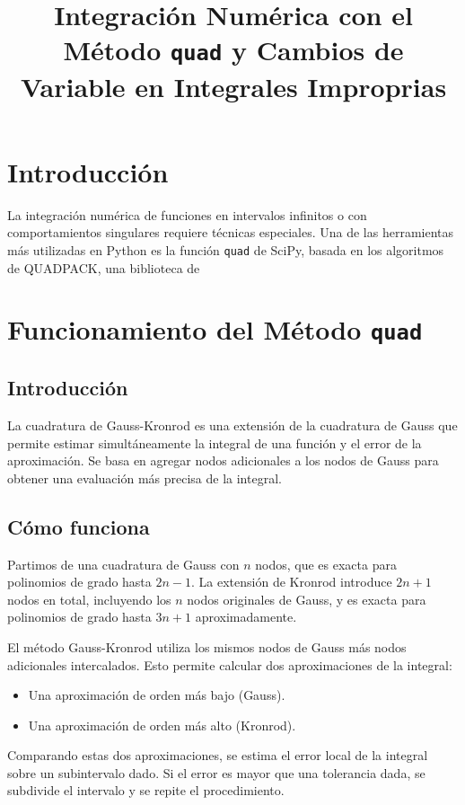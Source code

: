 \documentclass{article}
\title{Integraci\'on Num\'erica con el M\'etodo \texttt{quad} y Cambios de Variable en Integrales Improprias}
\author{}
\date{}
\begin{document}
\maketitle

\section{Introducción}
La integración numérica de funciones en intervalos infinitos o con comportamientos singulares requiere t\'ecnicas especiales. Una de las herramientas más utilizadas en Python es la función \texttt{quad} de SciPy, basada en los algoritmos de QUADPACK, una biblioteca de 

\section{Funcionamiento del Método \texttt{quad}}
\subsection{Introducción}
La cuadratura de Gauss-Kronrod es una extensión de la cuadratura de Gauss que permite estimar simultáneamente la integral de una función y el error de la aproximación. Se basa en agregar nodos adicionales a los nodos de Gauss para obtener una evaluación más precisa de la integral.

\subsection{Cómo funciona}
Partimos de una cuadratura de Gauss con $n$ nodos, que es exacta para polinomios de grado hasta $2n-1$. La extensi\'on de Kronrod introduce $2n+1$ nodos en total, incluyendo los $n$ nodos originales de Gauss, y es exacta para polinomios de grado hasta $3n+1$ aproximadamente.

El método Gauss-Kronrod utiliza los mismos nodos de Gauss más nodos adicionales intercalados. Esto permite calcular dos aproximaciones de la integral:
\begin{itemize}
    \item Una aproximación de orden más bajo (Gauss).
    \item Una aproximación de orden más alto (Kronrod).
\end{itemize}

Comparando estas dos aproximaciones, se estima el error local de la integral sobre un subintervalo dado. Si el error es mayor que una tolerancia dada, se subdivide el intervalo y se repite el procedimiento.
\end{document}
